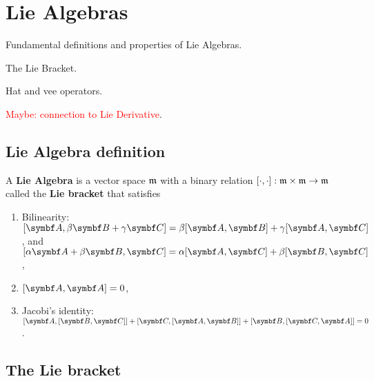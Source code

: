 
\chapter{Lie Algebras}

\begin{itemize_outcomes}
  \item Fundamental definitions and properties of Lie Algebras.
  \item The Lie Bracket.
  \item Hat and vee operators.
  \item \textcolor{red}{Maybe: connection to Lie Derivative}.
\end{itemize_outcomes}


\section{Lie Algebra definition}

\begin{definition}
  A \textbf{Lie Algebra} is a vector space $\mathfrak{m}$ with a binary relation $\left[ \cdot, \cdot \right] : \mathfrak{m} \times \mathfrak{m} \rightarrow \mathfrak{m}$ called the \textbf{Lie bracket} that satisfies
  \begin{enumerate}
    \item Bilinearity: $[ \A, \beta \B + \gamma \C ] = \beta [\A, \B] + \gamma [\A, \C]$, and $[ \alpha \A + \beta \B, \C ] = \alpha [\A, \C] + \beta [\B, \C]$,
    \item $[\A, \A] = 0$,
    \item Jacobi's identity: $[\A, [\B, \C]] + [\C, [\A, \B]] + [\B, [\C, \A]] = 0$.
  \end{enumerate}
\end{definition}


\section{The Lie bracket}




